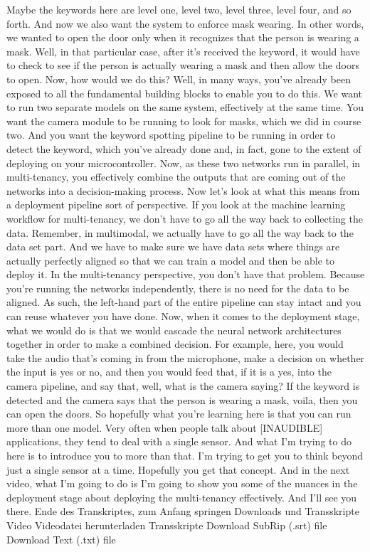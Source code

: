     Maybe the keywords here are level one, level two, level three, level four,
    and so forth.
    And now we also want the system to enforce mask wearing.
    In other words, we wanted to open the door only
    when it recognizes that the person is wearing a mask.
    Well, in that particular case, after it's received the keyword,
    it would have to check to see if the person is actually wearing a mask
    and then allow the doors to open.
    Now, how would we do this?
    Well, in many ways, you've already been exposed to all the fundamental building
    blocks to enable you to do this.
    We want to run two separate models on the same system, effectively
    at the same time.
    You want the camera module to be running to look
    for masks, which we did in course two.
    And you want the keyword spotting pipeline
    to be running in order to detect the keyword, which you've already done
    and, in fact, gone to the extent of deploying on your microcontroller.
    Now, as these two networks run in parallel, in multi-tenancy,
    you effectively combine the outputs that are coming out of the networks
    into a decision-making process.
    Now let's look at what this means from a deployment pipeline
    sort of perspective.
    If you look at the machine learning workflow for multi-tenancy,
    we don't have to go all the way back to collecting the data.
    Remember, in multimodal, we actually have to go all the way back
    to the data set part.
    And we have to make sure we have data sets
    where things are actually perfectly aligned so that we can train a model
    and then be able to deploy it.
    In the multi-tenancy perspective, you don't have that problem.
    Because you're running the networks independently,
    there is no need for the data to be aligned.
    As such, the left-hand part of the entire pipeline can stay intact
    and you can reuse whatever you have done.
    Now, when it comes to the deployment stage, what we would do
    is that we would cascade the neural network architectures together
    in order to make a combined decision.
    For example, here, you would take the audio that's
    coming in from the microphone, make a decision
    on whether the input is yes or no, and then you would feed that,
    if it is a yes, into the camera pipeline,
    and say that, well, what is the camera saying?
    If the keyword is detected and the camera
    says that the person is wearing a mask, voila, then you can open the doors.
    So hopefully what you're learning here is
    that you can run more than one model.
    Very often when people talk about [INAUDIBLE] applications,
    they tend to deal with a single sensor.
    And what I'm trying to do here is to introduce you to more than that.
    I'm trying to get you to think beyond just a single sensor at a time.
    Hopefully you get that concept.
    And in the next video, what I'm going to do
    is I'm going to show you some of the nuances in the deployment stage
    about deploying the multi-tenancy effectively.
    And I'll see you there.
    Ende des Transkriptes, zum Anfang springen
    Downloads und Transskripte
    Video
    Videodatei herunterladen
    Transskripte
    Download SubRip (.srt) file
    Download Text (.txt) file    
    
